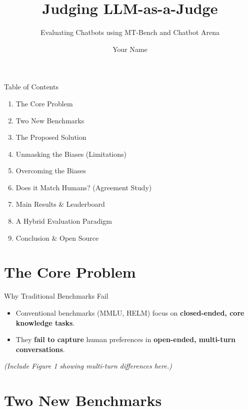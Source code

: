 \documentclass[10pt]{beamer}
\title{Judging LLM-as-a-Judge}
\subtitle{Evaluating Chatbots using MT-Bench and Chatbot Arena}
\date{}
\author{Your Name} %
\institute{Your Institution} %
\begin{document}
\maketitle

\begin{frame}{Table of Contents}
  \begin{enumerate}
    \item The Core Problem
    \item Two New Benchmarks
    \item The Proposed Solution
    \item Unmasking the Biases (Limitations)
    \item Overcoming the Biases
    \item Does it Match Humans? (Agreement Study)
    \item Main Results \& Leaderboard
    \item A Hybrid Evaluation Paradigm
    \item Conclusion \& Open Source
  \end{enumerate}
\end{frame}

\section{The Core Problem}

\begin{frame}{Why Traditional Benchmarks Fail}
  \begin{itemize}
    \item Conventional benchmarks (MMLU, HELM) focus on \textbf{closed-ended, core knowledge tasks}.
    \item They \textbf{fail to capture} human preferences in \textbf{open-ended, multi-turn conversations}.
  \end{itemize}
  \vspace{0.3cm}
  \textit{(Include Figure 1 showing multi-turn differences here.)}
\end{frame}

\section{Two New Benchmarks}
\end{document}
